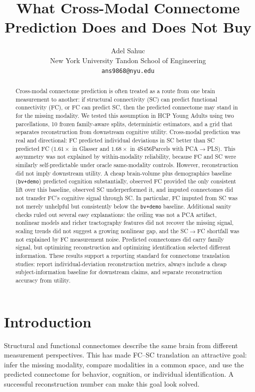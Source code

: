 \documentclass{article}
\title{What Cross-Modal Connectome Prediction Does and Does Not Buy}
\author{%
  Adel Sahuc \\
  New York University Tandon School of Engineering \\
  \texttt{ans9868@nyu.edu}%
}
\newcommand{\scfc}{SC$\rightarrow$FC}
\newcommand{\bvdemo}{\texttt{bv+demo}}
\begin{document}
\maketitle

\begin{abstract}
Cross-modal connectome prediction is often treated as a route from one brain measurement to another: if structural connectivity (SC) can predict functional connectivity (FC), or FC can predict SC, then the predicted connectome may stand in for the missing modality. We tested this assumption in HCP Young Adults using two parcellations, 10 frozen family-aware splits, deterministic estimators, and a grid that separates reconstruction from downstream cognitive utility. Cross-modal prediction was real and directional: FC predicted individual deviations in SC better than SC predicted FC ($1.61\times$ in Glasser and $1.68\times$ in 4S456Parcels with PCA$\rightarrow$PLS). This asymmetry was not explained by within-modality reliability, because FC and SC were similarly self-predictable under oracle same-modality controls. However, reconstruction did not imply downstream utility. A cheap brain-volume plus demographics baseline (\bvdemo) predicted cognition substantially, observed FC provided the only consistent lift over this baseline, observed SC underperformed it, and imputed connectomes did not transfer FC's cognitive signal through SC. In particular, FC imputed from SC was not merely unhelpful but consistently below the \bvdemo{} baseline. Additional sanity checks ruled out several easy explanations: the ceiling was not a PCA artifact, nonlinear models and richer tractography features did not recover the missing signal, scaling trends did not suggest a growing nonlinear gap, and the \scfc{} shortfall was not explained by FC measurement noise. Predicted connectomes did carry family signal, but optimizing reconstruction and optimizing identification selected different information. These results support a reporting standard for connectome translation studies: report individual-deviation reconstruction metrics, always include a cheap subject-information baseline for downstream claims, and separate reconstruction accuracy from utility.
\end{abstract}

\section{Introduction}

Structural and functional connectomes describe the same brain from different measurement perspectives. This has made FC--SC translation an attractive goal: infer the missing modality, compare modalities in a common space, and use the predicted connectome for behavior, cognition, or individual identification. A successful reconstruction number can make this goal look solved.
\end{document}
